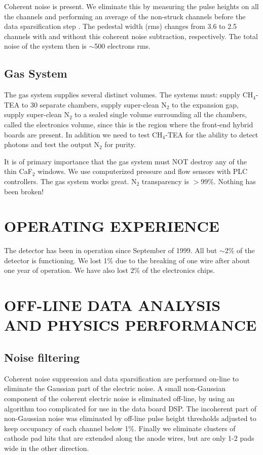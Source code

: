 \documentclass[fleqn,twoside]{article}
\begin{document}
Coherent noise is present. We eliminate this by measuring the
pulse heights on all the channels and performing an average of the
non-struck channels before the data sparsification step
\cite{DSP}. The pedestal width (rms) changes from 3.6 to 2.5
channels with and without this coherent noise subtraction,
respectively. The total noise of the system then is $\sim$500
electrons rms.

\subsection{Gas System}
The gas system supplies several distinct volumes. The systems
must: supply CH$_4$-TEA to 30 separate chambers, supply
super-clean N$_2$  to the expansion gap, supply super-clean N$_2$
to a sealed single volume surrounding all the chambers, called the
electronics volume, since this is the region where the front-end
hybrid boards are present. In addition we need to test CH$_4$-TEA
for the ability to detect photons and test the output N$_2$ for
purity.

It is of primary importance that the gas system must NOT destroy any of the thin CaF$_2$ windows. We use computerized pressure and flow sensors with PLC controllers. The gas system works great. N$_2$  transparency is
$>$99\%. Nothing has been broken!

\section{OPERATING EXPERIENCE}

The detector has been in operation since September of 1999.
All but $\sim$2\% of the detector is functioning. We lost 1\% due to the
breaking of one wire after about one year of operation.
We have also lost 2\% of the electronics chips.


\section{OFF-LINE DATA ANALYSIS AND PHYSICS PERFORMANCE}

\subsection{Noise filtering}

Coherent noise suppression and data sparsification are performed
on-line to eliminate the Gaussian part of the electric noise. A
small non-Gaussian component of the coherent electric noise is
eliminated off-line, by using an algorithm too complicated for use
in the data board DSP. The incoherent part of non-Gaussian noise
was eliminated by off-line pulse height thresholds adjusted to
keep occupancy of each channel below 1\%. Finally we eliminate
clusters of cathode pad hits that are extended along the anode
wires, but are only 1-2 pads wide in the other direction.
\end{document}
